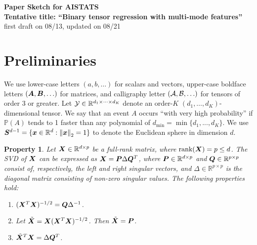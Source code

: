 \documentclass[11pt]{article}
\theoremstyle{plain}
\newtheorem{pro}{Property}
\theoremstyle{definition}
\begin{document}
\begin{center}
{\bf \large Paper Sketch for AISTATS\\
Tentative title: ``Binary tensor regression with multi-mode features''}\\
first draft on 08/13, updated on 08/21
\end{center}

\section{Preliminaries}


We use lower-case letters $(a, b, \ldots)$ for scalars and vectors, upper-case boldface letters $(\bm A, \bm B, \ldots)$ for matrices, and calligraphy letter $(\mathcal{A},\mathcal{B},\ldots)$ for tensors of order 3 or greater. Let $\mathcal{Y} \in \mathbb{R}^{d_1\times \cdots \times d_K}$ denote an order-$K$ $(d_1,\ldots,d_K)$-dimensional tensor. We say that an event $A$ occurs ``with very high probability'' if $\mathbb{P}(A)$ tends to 1 faster than any polynomial of $d_{\min}=\min\{d_1, . . . , d_K\}$. We use $\bm S^{d-1}=\{\bm x\in\mathbb{R}^d: \left\lVert\bm x\right\rVert_2=1\}$ to denote the Euclidean sphere in dimension $d$.\\


\begin{pro}\label{eq:defn}
Let $\bm X\in\mathbb{R}^{d\times p}$ be a full-rank matrix, where $\text{rank}(\bm X)=p\leq d$. The SVD of $\bm X$ can be expressed as $\bm X=\bm{P}\Delta\bm{Q}^T$, where $\bm{P}\in\mathbb{R}^{d\times p}$ and $\bm{Q}\in\mathbb{R}^{p\times p}$ consist of, respectively, the left and right singular vectors, and $\Delta\in\mathbb{R}^{p\times p}$ is the diagonal matrix consisting of non-zero singular values. The following properties hold:
\begin{enumerate}
\item $(\bm X^T\bm X)^{-1/2}=\bm{Q}\Delta^{-1}$.
\item Let $\tilde {\bm X}=\bm X(\bm X^T\bm X)^{-1/2}$. Then $\tilde {\bm X}=\bm{P}$.
\item $\tilde {\bm X}^T\bm X=\Delta\bm{Q}^T$.
\end{enumerate}
\end{pro}
\end{document}
